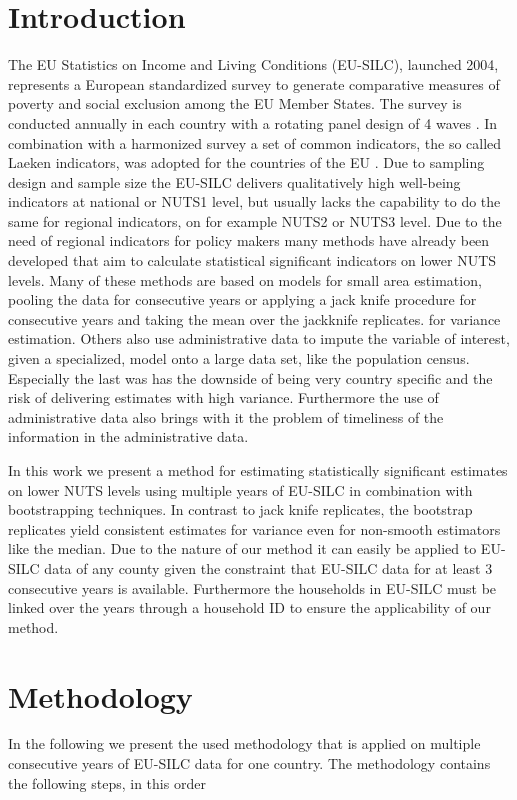 \documentclass{scrartcl}
\begin{document}
\section{Introduction}

The EU Statistics on Income and Living Conditions (EU-SILC), launched 2004, represents a European standardized survey to generate comparative measures of poverty and social exclusion among the EU Member States. The survey is conducted annually in each country with a rotating panel design of 4 waves \citep[see][]{vebe2006}. In combination with a harmonized survey a set of common indicators, the so called Laeken indicators, was adopted for the countries of the EU \citep[see][]{atkinson2002}.
\newline
Due to sampling design and sample size the EU-SILC delivers qualitatively high well-being indicators at national or NUTS1 level, but usually lacks the capability to do the same for regional indicators, on for example NUTS2 or NUTS3 level. Due to the need of regional indicators for policy makers many methods have already been developed that aim to calculate statistical significant indicators on lower NUTS levels.\citep{gigaleva2012,povmap}
Many of these methods are based on models for small area estimation, pooling the data for consecutive years or applying a jack knife procedure for consecutive years and taking the mean over the jackknife replicates. for variance estimation. Others also use administrative data to impute the variable of interest, given a specialized, model onto a large data set, like the population census. Especially the last was has the downside of being very country specific and the risk of delivering estimates with high variance. Furthermore the use of administrative data also brings with it the problem of timeliness of the information in the administrative data.

In this work we present a method for estimating statistically significant estimates on lower NUTS levels using multiple years of EU-SILC in combination with bootstrapping techniques. In contrast to jack knife replicates, the bootstrap replicates yield consistent estimates for variance even for non-smooth estimators like the median. Due to the nature of our method it can easily be applied to EU-SILC data of any county given the constraint that EU-SILC data for at least 3 consecutive years is available. Furthermore the households in EU-SILC must be linked over the years through a household ID to ensure the applicability of our method.


\section{Methodology}
In the following we present the used methodology that is applied on multiple consecutive years of EU-SILC data for one country. The methodology contains the following steps, in this order
\end{document}
